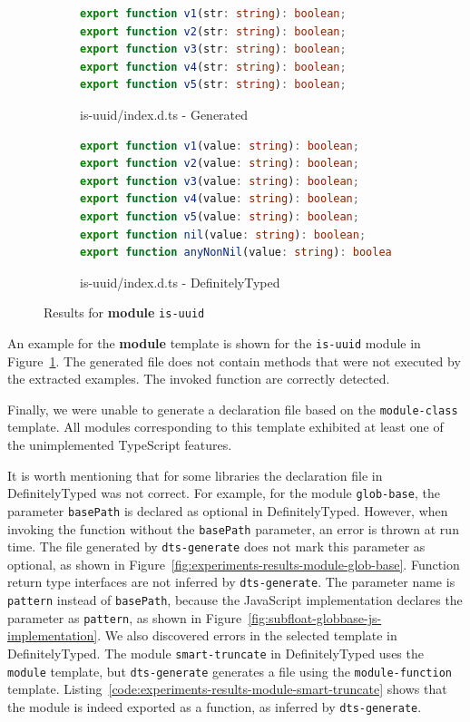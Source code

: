 \documentclass[english,cleveref,autoref,submission]{programming}
\newcommand{\figref}[1]{Figure~\ref{#1}}
\newcommand{\coderef}[1]{Listing~\ref{#1}}
\begin{document}
\begin{figure}[tp]
    \centering
    \begin{subfigure}{0.48\linewidth}
      \begin{lstlisting}[language=TypeScript,numbers=none]
export function v1(str: string): boolean;
export function v2(str: string): boolean;
export function v3(str: string): boolean;
export function v4(str: string): boolean;
export function v5(str: string): boolean;
      \end{lstlisting}
      \caption{is-uuid/index.d.ts - Generated}
    \end{subfigure}
    \hfill
    \begin{subfigure}{0.48\linewidth}
      \begin{lstlisting}[language=TypeScript,numbers=none]
export function v1(value: string): boolean;
export function v2(value: string): boolean;
export function v3(value: string): boolean;
export function v4(value: string): boolean;
export function v5(value: string): boolean;
export function nil(value: string): boolean;
export function anyNonNil(value: string): boolean;
      \end{lstlisting}
      \caption{is-uuid/index.d.ts - DefinitelyTyped}
    \end{subfigure}

    \caption{Results for \textbf{module} \texttt{is-uuid}}
    \label{fig:experiments-results-module-is-uuid}
\end{figure}

An example for the \textbf{module} template
is shown for the \texttt{is-uuid} module in
\figref{fig:experiments-results-module-is-uuid}.
The generated file does not contain methods that were not executed by the extracted
examples. The invoked function are correctly detected.

Finally, we were unable to  generate a declaration file based on the
\texttt{module-class} template. All modules corresponding to this template exhibited at least one of
the unimplemented TypeScript features. 

It is worth mentioning that for some libraries the declaration file in DefinitelyTyped was
not correct. For example, for the module \texttt{glob-base}, the parameter
\texttt{basePath} is declared as optional in DefinitelyTyped. However, when invoking the
function without the \texttt{basePath} parameter, an error is thrown at run time. The file generated by
\texttt{dts-generate} does not mark this parameter as optional, as shown in
\figref{fig:experiments-results-module-glob-base}. Function return type interfaces are
not inferred by \texttt{dts-generate}. The parameter name is \texttt{pattern}
instead of \texttt{basePath}, because the JavaScript implementation declares the parameter
as \texttt{pattern}, as shown in \figref{fig:subfloat-globbase-js-implementation}. We also
discovered errors in the selected template in DefinitelyTyped. The module
\texttt{smart-truncate} in DefinitelyTyped uses the \texttt{module} template, but
\texttt{dts-generate} generates a file using the \texttt{module-function}
template. \coderef{code:experiments-results-module-smart-truncate} shows that the module is indeed
exported as a function, as inferred by \texttt{dts-generate}.
\end{document}

